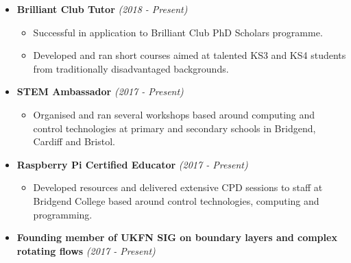 \documentclass[10pt,a4paper,sans]{moderncv}        %
\begin{document}
\begin{itemize}

\item{ \textbf{Brilliant Club Tutor} \textit{(2018 - Present)}

\vspace{4pt}

\small{
\begin{itemize}	
	\item Successful in application to Brilliant Club PhD Scholars programme.
	\vspace{3pt} 
	\item Developed and ran short courses aimed at talented KS3 and KS4 students from traditionally disadvantaged backgrounds.
\end{itemize}
} }

\vspace{4pt}

\item{ \textbf{STEM Ambassador} \textit{(2017 - Present)} 

\vspace{4pt}

\small{
\begin{itemize}	
	\item Organised and ran several workshops based around computing and control technologies at primary and secondary schools in Bridgend, Cardiff and Bristol.
\end{itemize}
} }

\vspace{4pt}

\item{ \textbf{Raspberry Pi Certified Educator} \textit{(2017 - Present)}

\vspace{4pt}

\small{
\begin{itemize}	
	\item Developed resources and delivered extensive CPD sessions to staff at Bridgend College based around control technologies, computing and programming.
\end{itemize}
} }

\vspace{4pt}

\item{\textbf{Founding member of UKFN SIG on boundary layers and complex rotating flows} \textit{(2017 - Present)}

\vspace{4pt}

}
\end{itemize}
\end{document}
